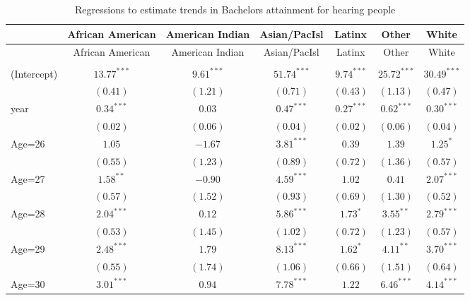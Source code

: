 \documentclass[fullpage]{paper}
\begin{document}
\begin{center}
\begin{longtable}{l c c c c c c }
\hline
 & African American & American Indian & Asian/PacIsl & Latinx & Other & White \\
\hline
\endfirsthead
\hline
 & African American & American Indian & Asian/PacIsl & Latinx & Other & White \\
\hline
\endhead
\hline
\endfoot
\hline
\multicolumn{7}{l}{\scriptsize{$^{***}p<0.001$, $^{**}p<0.01$, $^*p<0.05$}}\\
\caption{Regressions to estimate trends in Bachelors attainment for hearing people}
\label{table:coefficients}
\endlastfoot
(Intercept) & $13.77^{***}$ & $9.61^{***}$  & $51.74^{***}$  & $9.74^{***}$ & $25.72^{***}$ & $30.49^{***}$ \\
            & $(0.41)$      & $(1.21)$      & $(0.71)$       & $(0.43)$     & $(1.13)$      & $(0.47)$      \\
year        & $0.34^{***}$  & $0.03$        & $0.47^{***}$   & $0.27^{***}$ & $0.62^{***}$  & $0.30^{***}$  \\
            & $(0.02)$      & $(0.06)$      & $(0.04)$       & $(0.02)$     & $(0.06)$      & $(0.04)$      \\
Age=26      & $1.05$        & $-1.67$       & $3.81^{***}$   & $0.39$       & $1.39$        & $1.25^{*}$    \\
            & $(0.55)$      & $(1.23)$      & $(0.89)$       & $(0.72)$     & $(1.36)$      & $(0.57)$      \\
Age=27      & $1.58^{**}$   & $-0.90$       & $4.59^{***}$   & $1.02$       & $0.41$        & $2.07^{***}$  \\
            & $(0.57)$      & $(1.52)$      & $(0.93)$       & $(0.69)$     & $(1.30)$      & $(0.52)$      \\
Age=28      & $2.04^{***}$  & $0.12$        & $5.86^{***}$   & $1.73^{*}$   & $3.55^{**}$   & $2.79^{***}$  \\
            & $(0.53)$      & $(1.45)$      & $(1.02)$       & $(0.72)$     & $(1.23)$      & $(0.57)$      \\
Age=29      & $2.48^{***}$  & $1.79$        & $8.13^{***}$   & $1.62^{*}$   & $4.11^{**}$   & $3.70^{***}$  \\
            & $(0.55)$      & $(1.74)$      & $(1.06)$       & $(0.66)$     & $(1.51)$      & $(0.64)$      \\
Age=30      & $3.01^{***}$  & $0.94$        & $7.78^{***}$   & $1.22$       & $6.46^{***}$  & $4.14^{***}$  \\

\end{longtable}
\end{center}
\end{document}
